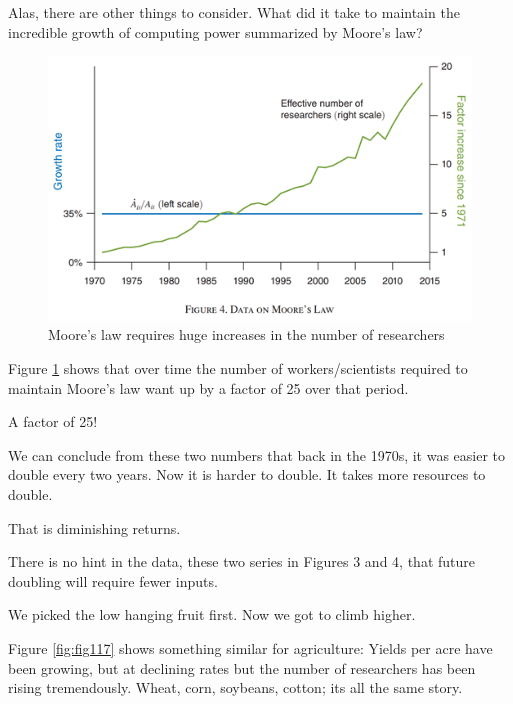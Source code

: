 \documentclass[
]{book}
\begin{document}
Alas, there are other things to consider. What did it take to maintain the incredible growth of computing power summarized by Moore's law?

\begin{figure}
\includegraphics[width=1\linewidth]{img/ch1/moore16} \caption{Moore’s law requires huge increases in the number of researchers}\label{fig:fig116}
\end{figure}

Figure \ref{fig:fig116} shows that over time the number of workers/scientists required to maintain Moore's law want up by a factor of 25 over that period.

A factor of 25!

We can conclude from these two numbers that back in the 1970s, it was easier to double every two years. Now it is harder to double. It takes more resources to double.

That is diminishing returns.

There is no hint in the data, these two series in Figures 3 and 4, that future doubling will require fewer inputs.

We picked the low hanging fruit first. Now we got to climb higher.

Figure \ref{fig:fig117} shows something similar for agriculture: Yields per acre have been growing, but at declining rates but the number of researchers has been rising tremendously. Wheat, corn, soybeans, cotton; its all the same story.
\end{document}
